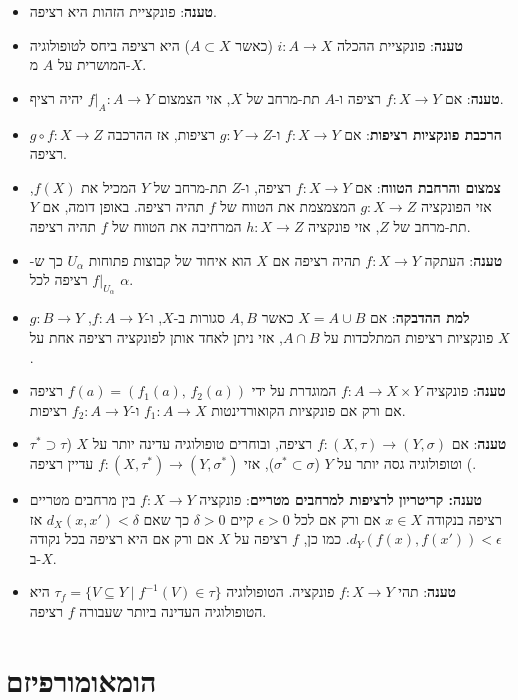 \documentclass{tstextbook}
\begin{document}
\begin{summary}
\begin{itemize}
    \item \textbf{טענה}: פונקציית הזהות היא רציפה.
    \item \textbf{טענה}: פונקציית ההכלה \(i: A \to X\) (כאשר \(A \subset X\)) היא רציפה ביחס לטופולוגיה המושרית על \(A\) מ-\(X\).
    \item \textbf{טענה}: אם \(f:X\to Y\) רציפה ו-\(A\) תת-מרחב של \(X\), אזי הצמצום \(f|_{A}:A\to Y\) יהיה רציף.
    \item \textbf{הרכבת פונקציות רציפות}: אם \(f: X \to Y\) ו-\(g: Y \to Z\) רציפות, אז ההרכבה \(g \circ f: X \to Z\) רציפה.
    \item \textbf{צמצום והרחבת הטווח}: אם \(f:X\to Y\) רציפה, ו-\(Z\) תת-מרחב של \(Y\) המכיל את \(f(X)\), אזי הפונקציה \(g:X\to Z\) המצמצמת את הטווח של \(f\) תהיה רציפה. באופן דומה, אם \(Y\) תת-מרחב של \(Z\), אזי פונקציה \(h:X\to Z\) המרחיבה את הטווח של \(f\) תהיה רציפה.
    \item \textbf{טענה}: העתקה \(f:X\to Y\) תהיה רציפה אם \(X\) הוא איחוד של קבוצות פתוחות \(U_{\alpha}\) כך ש-\(f|_{U_{\alpha}}\) רציפה לכל \(\alpha\).
    \item \textbf{למת ההדבקה}: אם \(X=A\cup B\) כאשר \(A,B\) סגורות ב-\(X\), ו-\(f:A\to Y\), \(g:B\to Y\) פונקציות רציפות המתלכדות על \(A \cap B\), אזי ניתן לאחד אותן לפונקציה רציפה אחת על \(X\).
    \item \textbf{טענה}: פונקציה \(f:A\to X\times Y\) המוגדרת על ידי \(f(a)=(f_{1}(a),\,f_{2}(a))\) רציפה אם ורק אם פונקציות הקואורדינטות \(f_{1}:A\to X\) ו-\(f_{2}:A\to Y\) רציפות.
    \item \textbf{טענה}: אם \(f: (X, \tau) \to (Y, \sigma)\) רציפה, ובוחרים טופולוגיה עדינה יותר על \(X\) (\(\tau^* \supset \tau\)) וטופולוגיה גסה יותר על \(Y\) (\(\sigma^* \subset \sigma\)), אזי \(f: (X, \tau^*) \to (Y, \sigma^*)\) עדיין רציפה.
    \item \textbf{טענה: קריטריון לרציפות למרחבים מטריים}: פונקציה \(f: X \to Y\) בין מרחבים מטריים רציפה בנקודה \(x \in X\) אם ורק אם לכל \(\epsilon > 0\) קיים \(\delta > 0\) כך שאם \(d_X(x, x') < \delta\) אז \(d_Y(f(x), f(x')) < \epsilon\). כמו כן, \(f\) רציפה על \(X\) אם ורק אם היא רציפה בכל נקודה ב-\(X\).
    \item \textbf{טענה}: תהי \(f:X\to Y\) פונקציה. הטופולוגיה \(\tau_f = \{ V \subseteq Y \mid f^{-1}(V) \in \tau \}\) היא הטופולוגיה העדינה ביותר שעבורה \(f\) רציפה.
  \end{itemize}
\end{summary}
\section{הומאומורפיזם}
\end{document}
